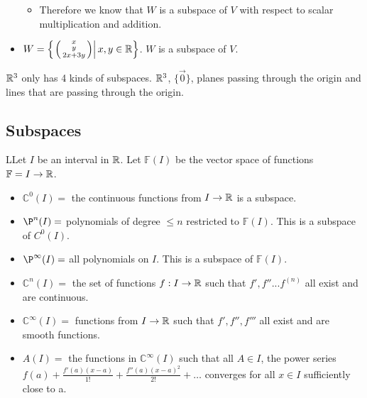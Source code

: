 \begin{itemize}
\begin{itemize}
      \item Therefore we know that $W$ is a subspace of $V$ with respect to scalar multiplication and addition.
    \end{itemize}
    \item $W=\left\{\left.\left(\begin{smallmatrix}x\\y\\2x+3y\end{smallmatrix}\right)\right|x,y\in\mathbb{R}\right\}$. $W$ is a subspace of $V$.
  \end{itemize}

  $\mathbb{R}^3$ only has 4 kinds of subspaces. $\mathbb{R}^3$, $\{\vec{0}\}$, planes passing through the origin and lines that are passing through the origin.

  
\subsection{Subspaces}

  \begin{definition}
    LLet $I$ be an interval in $\mathbb{R}$. Let $\mathbb{F}(I)$ be the vector space of functions $\mathbb{F}=I\to\mathbb{R}$.

    \begin{itemize}
      \item $\mathbb{C}^0(I)=$ the continuous functions from $I\to\mathbb{R}$ is a subspace.
      \item $\P^n(I)=$ polynomials of degree $\le n$ restricted to $\mathbb{F}(I)$. This is a subspace of $C^0(I)$.
      \item $\P^\infty(I)=$ all polynomials on $I$. This is a subspace of $\mathbb{F}(I)$.
      \item $\mathbb{C}^n (I)=$ the set of functions $f:I\to\mathbb{R}$ such that $f',f''...f^{(n)}$ all exist and are continuous.
      \item $\mathbb{C}^\infty(I)=$ functions from $I\to\mathbb{R}$ such that $f',f'',f'''$ all exist and are smooth functions.
      \item $A(I)=$ the functions in $\mathbb{C}^\infty(I)$ such that all $A\in I$, the power series $f(a)+\frac{f'(a)(x-a)}{1!}+\frac{f''(a)(x-a)^2}{2!}+\dots$ converges for all $x\in I$ sufficiently close to a.
    \end{itemize}
  \end{definition}

